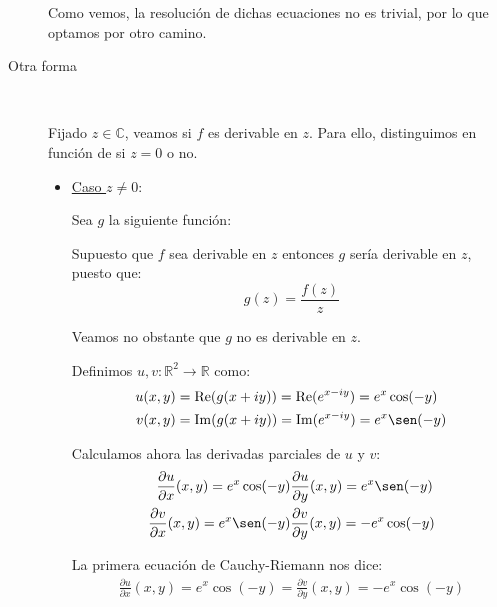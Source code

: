 \documentclass[12pt]{article}
\renewcommand{\Re}{\operatorname{Re}} %
\renewcommand{\Im}{\operatorname{Im}}
\begin{document}
\begin{ejercicio}[3 puntos]
\begin{description}
        Como vemos, la resolución de dichas ecuaciones no es trivial, por lo que optamos por otro camino.


        \item[Otra forma]~
        
        Fijado $z\in \mathbb{C}$, veamos si $f$ es derivable en $z$. Para ello, distinguimos en función de si $z=0$ o no.
        \begin{itemize}
            \item \ul{Caso $z\neq 0$}:
            
            Sea $g$ la siguiente función:

            Supuesto que $f$ sea derivable en $z$ entonces $g$ sería derivable en $z$, puesto que:
            \begin{equation*}
                g(z) = \frac{f(z)}{z}
            \end{equation*}

            Veamos no obstante que $g$ no es derivable en $z$.
                
                Definimos $u,v:\mathbb{R}^2\to\mathbb{R}$ como:
                \begin{align*}
                    u(x,y) &= \Re(g(x+iy)) = \Re(e^{x-iy}) = e^x\cos (-y)\\
                    v(x,y) &= \Im(g(x+iy)) = \Im(e^{x-iy}) = e^x\sen (-y)
                \end{align*}

                Calculamos ahora las derivadas parciales de $u$ y $v$:
                \begin{align*}
                    \frac{\partial u}{\partial x}(x,y) = e^x\cos (-y)&
                    \frac{\partial u}{\partial y}(x,y) = e^x\sen (-y)\\
                    \frac{\partial v}{\partial x}(x,y) = e^x\sen (-y)&
                    \frac{\partial v}{\partial y}(x,y) = -e^x\cos (-y)
                \end{align*}

                La primera ecuación de Cauchy-Riemann nos dice:
                \begin{align*}
                    \frac{\partial u}{\partial x}(x,y) = e^x\cos(-y)
                    = \frac{\partial v}{\partial y}(x,y) = -e^x\cos(-y)
                \end{align*}


\end{itemize}
\end{description}
\end{ejercicio}
\end{document}
